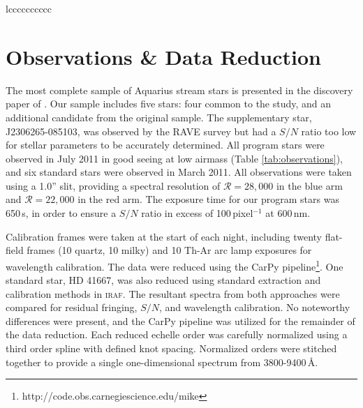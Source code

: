 \documentclass{emulateapj}
\begin{document}
\begin{deluxetable*}{lcccccccccc}




\enddata
{}
\end{deluxetable*}


\section{Observations \& Data Reduction}

The most complete sample of Aquarius stream stars is presented in the discovery paper of \citet{williams;et-al_2011}. Our sample includes five stars: four common to the \citet{wylie-de-boer;et-al_2012} study, and an additional candidate from the original \citet{williams;et-al_2011} sample. The supplementary star, J2306265-085103, was observed by the RAVE survey but had a $S/N$ ratio too low for stellar parameters to be accurately determined. All program stars were observed in July 2011 in good seeing at low airmass (Table \ref{tab:observations}), and six  standard stars were observed in March 2011. All observations were taken using a 1.0'' slit, providing a spectral resolution of $\mathcal{R} = 28,000$ in the blue arm and $\mathcal{R} = 22,000$ in the red arm. The exposure time for our program stars was 650\,s, in order to ensure a $S/N$ ratio in excess of 100\,pixel$^{-1}$ at 600\,nm.

Calibration frames were taken at the start of each night, including twenty flat-field frames (10 quartz, 10 milky) and 10 Th-Ar arc lamp exposures for wavelength calibration. The data were reduced using the CarPy pipeline\footnote{http://code.obs.carnegiescience.edu/mike}. One standard star, HD 41667, was also reduced using standard extraction and calibration methods in \textsc{iraf}. The resultant spectra from both approaches were compared for residual fringing, $S/N$, and wavelength calibration. No noteworthy differences were present, and the CarPy pipeline was utilized for the remainder of the data reduction. Each reduced echelle order was carefully normalized using a third order spline with defined knot spacing. Normalized orders were stitched together to provide a single one-dimensional spectrum from 3800-9400\,\AA{}. 
 
\end{document}
